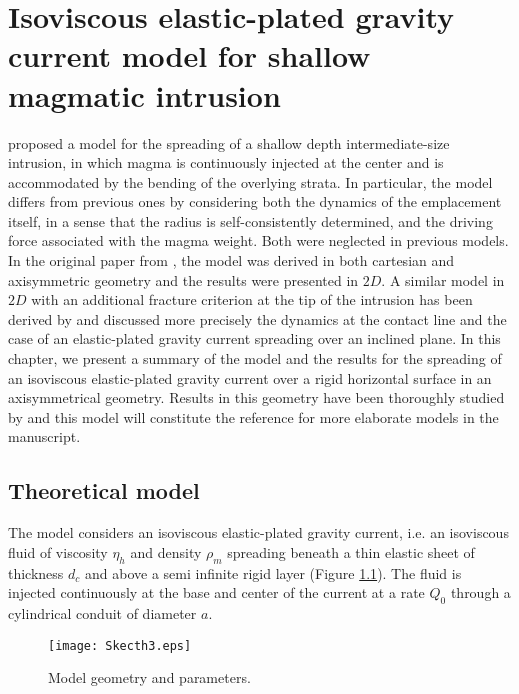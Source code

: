 \chapter{Isoviscous elastic-plated  gravity current model  for shallow
  magmatic intrusion}

\label{chap2} 
\minitoc

\citet{Michaut:2011kg} proposed a model for the spreading of a shallow
depth intermediate-size intrusion, in which magma is continuously
injected  at the  center and  is accommodated  by the  bending of  the
overlying strata.  In particular, the model differs from previous ones
by considering both the dynamics of the emplacement itself, in a sense
that the radius is self-consistently determined, and the driving force
associated with the magma weight. Both were neglected in previous models.
In  the  original paper  from  \citet{Michaut:2011kg},  the model  was
derived in  both cartesian and  axisymmetric geometry and  the results
were presented  in $2D$.  A similar  model in $2D$ with  an additional
fracture criterion  at the tip  of the  intrusion has been  derived by
\citet{Bunger:2011cb}  and  \citet{Anonymous:QWXp_4JV} discussed  more
precisely  the  dynamics at  the  contact  line  and  the case  of  an
elastic-plated gravity  current spreading over an  inclined plane.  In
this chapter,  we present a summary  of the model and  the results for
the spreading of  an isoviscous elastic-plated gravity  current over a
rigid horizontal  surface in  an axisymmetrical geometry.   Results in
this geometry  have been  thoroughly studied  by \citet{Lister:2013ia}
and this model will constitute the reference for more elaborate models
in the manuscript.

\section{Theoretical model}
\label{C2-sec:model}

The model considers an isoviscous elastic-plated gravity current, i.e.
an  isoviscous  fluid  of  viscosity  $\eta_h$  and  density  $\rho_m$
spreading beneath a thin elastic sheet  of thickness $d_c$ and above a
semi infinite rigid layer \citep{Michaut:2011kg,Bunger:2011cb} (Figure
\ref{C2-Sketch}).  The fluid is injected  continuously at the base and
center of the current at a rate $Q_0$ through a cylindrical conduit of
diameter $a$.

\begin{figure}[h!]
  \begin{center}
    \graphicspath{ {/Users/thorey/Documents/These/Manuscript/Figure/Chapter2/} }
    \texttt{[image: Skecth3.eps]}
    \caption{Model geometry and parameters.}
    \label{C2-Sketch}
  \end{center}
\end{figure}

